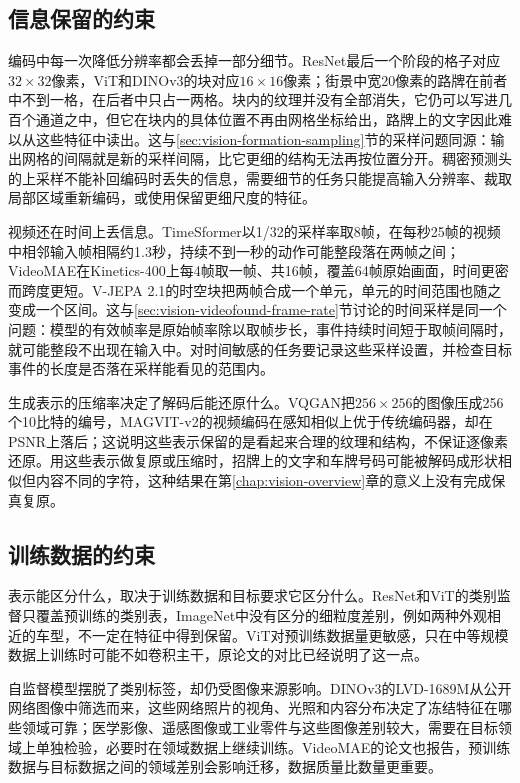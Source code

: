 \subsection{信息保留的约束}
\label{sec:vision-ivm-information}

编码中每一次降低分辨率都会丢掉一部分细节。ResNet最后一个阶段的格子对应$32\times32$像素，ViT和DINOv3的块对应$16\times16$像素；街景中宽20像素的路牌在前者中不到一格，在后者中只占一两格。块内的纹理并没有全部消失，它仍可以写进几百个通道之中，但它在块内的具体位置不再由网格坐标给出，路牌上的文字因此难以从这些特征中读出。这与\ref{sec:vision-formation-sampling}节的采样问题同源：输出网格的间隔就是新的采样间隔，比它更细的结构无法再按位置分开。稠密预测头的上采样不能补回编码时丢失的信息，需要细节的任务只能提高输入分辨率、裁取局部区域重新编码，或使用保留更细尺度的特征。

视频还在时间上丢信息。TimeSformer以1/32的采样率取8帧，在每秒25帧的视频中相邻输入帧相隔约1.3秒，持续不到一秒的动作可能整段落在两帧之间；VideoMAE在Kinetics-400上每4帧取一帧、共16帧，覆盖64帧原始画面，时间更密而跨度更短。V-JEPA 2.1的时空块把两帧合成一个单元，单元的时间范围也随之变成一个区间。这与\ref{sec:vision-videofound-frame-rate}节讨论的时间采样是同一个问题：模型的有效帧率是原始帧率除以取帧步长，事件持续时间短于取帧间隔时，就可能整段不出现在输入中。对时间敏感的任务要记录这些采样设置，并检查目标事件的长度是否落在采样能看见的范围内。

生成表示的压缩率决定了解码后能还原什么。VQGAN把$256\times256$的图像压成256个10比特的编号，MAGVIT-v2的视频编码在感知相似上优于传统编码器，却在PSNR上落后；这说明这些表示保留的是看起来合理的纹理和结构，不保证逐像素还原。用这些表示做复原或压缩时，招牌上的文字和车牌号码可能被解码成形状相似但内容不同的字符，这种结果在第\ref{chap:vision-overview}章的意义上没有完成保真复原。

\subsection{训练数据的约束}
\label{sec:vision-ivm-data}

表示能区分什么，取决于训练数据和目标要求它区分什么。ResNet和ViT的类别监督只覆盖预训练的类别表，ImageNet中没有区分的细粒度差别，例如两种外观相近的车型，不一定在特征中得到保留。ViT对预训练数据量更敏感，只在中等规模数据上训练时可能不如卷积主干，原论文的对比已经说明了这一点。

自监督模型摆脱了类别标签，却仍受图像来源影响。DINOv3的LVD-1689M从公开网络图像中筛选而来，这些网络照片的视角、光照和内容分布决定了冻结特征在哪些领域可靠；医学影像、遥感图像或工业零件与这些图像差别较大，需要在目标领域上单独检验，必要时在领域数据上继续训练。VideoMAE的论文也报告，预训练数据与目标数据之间的领域差别会影响迁移，数据质量比数量更重要。

